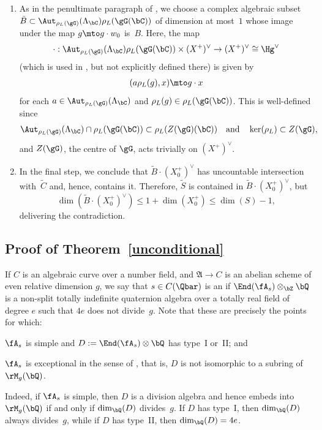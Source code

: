 \begin{enumerate}
\item As in the penultimate paragraph of \cite[\S6.5]{QRTUI}, we choose a complex algebraic subset $\tilde{B} \subset \Aut_{\rho_L(\gG)}(\Lambda_\bC) \rho_L(\gG(\bC))$ of dimension at most~$1$ whose image under the map $g \mto g \cdot w_0$ is~$B$.
Here, the map
\[
\cdot : \Aut_{\rho_L(\gG)}(\Lambda_\bC) \rho_L(\gG(\bC)) \times (X^+)^\vee\to (X^+)^\vee\cong\Hg^\vee
\] (which is used in \cite[\S6.5]{QRTUI}, but not explicitly defined there) is given by
\begin{align*}
(a\rho_L(g),x)\mto g\cdot x
\end{align*}
for each $a\in\Aut_{\rho_L(\gG)}(\Lambda_\bC)$ and $\rho_L(g)\in\rho_L(\gG(\bC))$. This is well-defined since
\begin{align*}
\Aut_{\rho_L(\gG)}(\Lambda_\bC)\cap\rho_L(\gG(\bC))\subset\rho_L(Z(\gG)(\bC))\quad\text{and}\quad\ker(\rho_L)\subset Z(\gG),
\end{align*}
and $Z(\gG)$, the centre of $\gG$, acts trivially on $(X^+)^\vee$.

\item In the final step, we conclude that $\tilde{B}\cdot(X^+_0)^\vee$ has uncountable intersection with~$\tilde{C}$ and, hence, contains it. Therefore, $\tilde{S}$ is contained in $\tilde{B}\cdot(X^+_0)^\vee$, but
\[
\dim(\tilde{B} \cdot (X^+_0)^\vee) \leq 1 + \dim(X_0^+) \leq \dim(S) - 1,
\]
delivering the contradiction.
\end{enumerate}

\subsection{Proof of Theorem~\ref{unconditional}}

If $C$ is an algebraic curve over a number field, and $\mathfrak{A}\to C$ is an abelian scheme of even relative dimension $g$, we say that $s\in C(\Qbar)$ is an  if $\End(\fA_s)\otimes_\bZ\bQ$ is a non-split totally indefinite quaternion algebra over a totally real field of degree $e$ such that $4e$ does not divide~$g$.
Note that these are precisely the points for which:
\begin{enumeratei}
\item $\fA_s$ is simple and $D := \End(\fA_s) \otimes \bQ$ has type~I or~II; and
\item $\fA_s$ is exceptional in the sense of \cite[Def.\,8.1]{ExCM}, that is, $D$ is not isomorphic to a subring of $\rM_g(\bQ)$.
\end{enumeratei}
Indeed, if $\fA_s$ is simple, then $D$ is a division algebra and hence embeds into $\rM_g(\bQ)$ if and only if $\dim_\bQ(D)$ divides~$g$.
If $D$ has type~I, then $\dim_\bQ(D)$ always divides~$g$, while if $D$ has type~II, then $\dim_\bQ(D) = 4e$.

